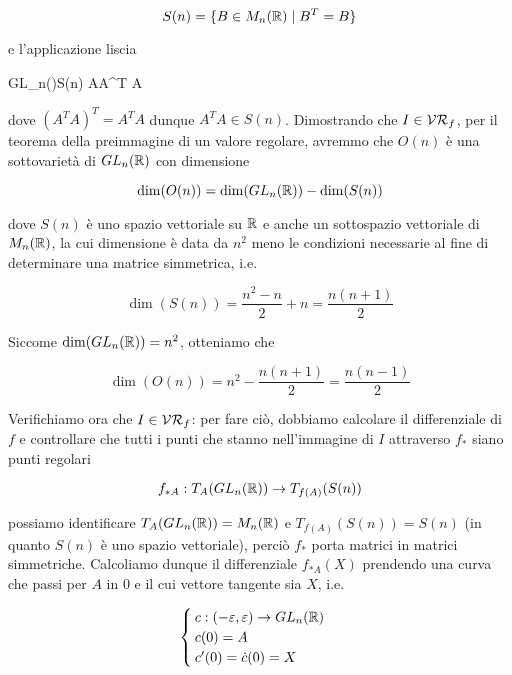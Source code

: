 \begin{equation}
	S(n) = \{ B \in M_{n}(\mathbb{R}) \mid B^{T} = B \}
\end{equation}

e l'applicazione liscia

	{GL_{n}(\R)}{S(n)}
	{A}{A^{T} A}

dove $ (A^{T} A)^{T} = A^{T} A $ dunque $ A^{T} A \in S(n) $. Dimostrando che $ I \in \mathcal{VR}_{f} $, per il teorema della preimmagine di un valore regolare, avremmo che $ O(n) $ è una sottovarietà di $ GL_{n}(\mathbb{R}) $ con dimensione

\begin{equation}
	\dim(O(n)) = \dim(GL_{n}(\mathbb{R})) - \dim(S(n))
\end{equation}

dove $ S(n) $ è uno spazio vettoriale su $ \mathbb{R} $ e anche un sottospazio vettoriale di $ M_{n}(\mathbb{R}) $, la cui dimensione è data da $ n^{2} $ meno le condizioni necessarie al fine di determinare una matrice simmetrica, i.e.

\begin{equation}
	\dim(S(n)) = \dfrac{n^{2} - n}{2} + n = \dfrac{n (n+1)}{2}
\end{equation}

Siccome $ \dim(GL_{n}(\mathbb{R})) = n^{2} $, otteniamo che

\begin{equation}
	\dim(O(n)) = n^{2} - \dfrac{n (n+1)}{2} = \dfrac{n (n-1)}{2}
\end{equation}

Verifichiamo ora che $ I \in \mathcal{VR}_{f} $: per fare ciò, dobbiamo calcolare il differenziale di $ f $ e controllare che tutti i punti che stanno nell'immagine di $ I $ attraverso $ f_{*} $ siano punti regolari

\begin{equation}
	f_{*A} : T_{A}(GL_{n}(\mathbb{R})) \to T_{f(A)}(S(n))
\end{equation}

possiamo identificare $ T_{A}(GL_{n}(\mathbb{R})) = M_{n}(\mathbb{R}) $ e $ T_{f(A)}(S(n)) = S(n) $ (in quanto $ S(n) $ è uno spazio vettoriale), perciò $ f_{*} $ porta matrici in matrici simmetriche. Calcoliamo dunque il differenziale $ f_{*A}(X) $ prendendo una curva che passi per $ A $ in 0 e il cui vettore tangente sia $ X $, i.e.

\begin{equation}
	\begin{cases}
		c : (-\varepsilon,\varepsilon) \to GL_{n}(\mathbb{R}) \\
		c(0) = A \\
		c'(0) = \dot{c}(0) = X
	\end{cases}
\end{equation}

